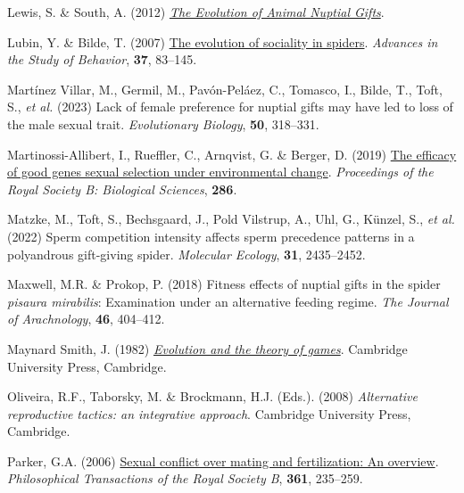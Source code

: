 \documentclass[
]{article}
\newlength{\cslhangindent}
\newlength{\cslentryspacingunit} %
\newenvironment{CSLReferences}[2] %
 {%
  \setlength{\parindent}{0pt}
  \ifodd #1
  \let\oldpar\par
  \def\par{\hangindent=\cslhangindent\oldpar}
  \fi
  \setlength{\parskip}{#2\cslentryspacingunit}
 }%
 {}
\begin{document}
\begin{CSLReferences}{0}{0}
\leavevmode{}%
Lewis, S. \& South, A. (2012)
\emph{\href{https://doi.org/10.1016/B978-0-12-394288-3.00002-2}{{The
Evolution of Animal Nuptial Gifts}}}.

\leavevmode{}%
Lubin, Y. \& Bilde, T. (2007)
\href{https://doi.org/10.1016/S0065-3454(07)37003-4}{{The evolution of
sociality in spiders}}. \emph{Advances in the Study of Behavior},
\textbf{37}, 83--145.

\leavevmode{}%
Martínez Villar, M., Germil, M., Pavón-Peláez, C., Tomasco, I., Bilde,
T., Toft, S., \emph{et al.} (2023) Lack of female preference for nuptial
gifts may have led to loss of the male sexual trait. \emph{Evolutionary
Biology}, \textbf{50}, 318--331.

\leavevmode{}%
Martinossi-Allibert, I., Rueffler, C., Arnqvist, G. \& Berger, D. (2019)
\href{https://doi.org/10.1098/rspb.2018.2313}{The efficacy of good genes
sexual selection under environmental change}. \emph{Proceedings of the
Royal Society B: Biological Sciences}, \textbf{286}.

\leavevmode{}%
Matzke, M., Toft, S., Bechsgaard, J., Pold Vilstrup, A., Uhl, G.,
Künzel, S., \emph{et al.} (2022) Sperm competition intensity affects
sperm precedence patterns in a polyandrous gift-giving spider.
\emph{Molecular Ecology}, \textbf{31}, 2435--2452.

\leavevmode{}%
Maxwell, M.R. \& Prokop, P. (2018) Fitness effects of nuptial gifts in
the spider \emph{pisaura mirabilis}: Examination under an alternative
feeding regime. \emph{The Journal of Arachnology}, \textbf{46},
404--412.

\leavevmode{}%
Maynard Smith, J. (1982)
\emph{\href{https://www.ncbi.nlm.nih.gov/pubmed/13761767}{{Evolution and
the theory of games}}}. Cambridge University Press, Cambridge.

\leavevmode{}%
Oliveira, R.F., Taborsky, M. \& Brockmann, H.J. (Eds.). (2008)
\emph{{Alternative reproductive tactics: an integrative approach}}.
Cambridge University Press, Cambridge.

\leavevmode{}%
Parker, G.A. (2006) \href{https://doi.org/10.1098/rstb.2005.1785}{Sexual
conflict over mating and fertilization: An overview}.
\emph{Philosophical Transactions of the Royal Society B}, \textbf{361},
235--259.


\end{CSLReferences}
\end{document}
